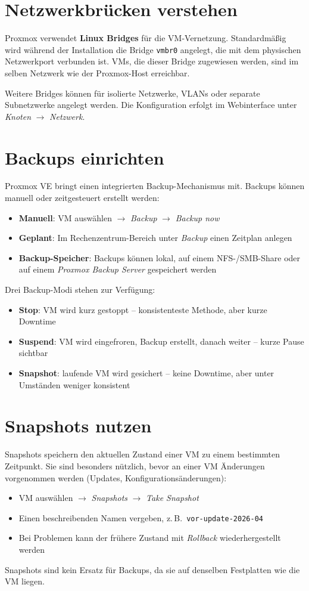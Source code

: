 \documentclass[11pt, oneside, numbers=noenddot]{scrbook}
\begin{document}
\section{Netzwerkbrücken verstehen}
Proxmox verwendet \textbf{Linux Bridges} für die VM-Vernetzung. Standardmäßig wird während der Installation die Bridge \texttt{vmbr0} angelegt, die mit dem physischen Netzwerkport verbunden ist. VMs, die dieser Bridge zugewiesen werden, sind im selben Netzwerk wie der Proxmox-Host erreichbar.

Weitere Bridges können für isolierte Netzwerke, VLANs oder separate Subnetzwerke angelegt werden. Die Konfiguration erfolgt im Webinterface unter \textit{Knoten} $\rightarrow$ \textit{Netzwerk}.

\section{Backups einrichten}
Proxmox VE bringt einen integrierten Backup-Mechanismus mit. Backups können manuell oder zeitgesteuert erstellt werden:
\begin{itemize}
  \item \textbf{Manuell}: VM auswählen $\rightarrow$ \textit{Backup} $\rightarrow$ \textit{Backup now}
  \item \textbf{Geplant}: Im Rechenzentrum-Bereich unter \textit{Backup} einen Zeitplan anlegen
  \item \textbf{Backup-Speicher}: Backups können lokal, auf einem NFS-/SMB-Share oder auf einem \textit{Proxmox Backup Server} gespeichert werden
\end{itemize}

Drei Backup-Modi stehen zur Verfügung:
\begin{itemize}
  \item \textbf{Stop}: VM wird kurz gestoppt -- konsistenteste Methode, aber kurze Downtime
  \item \textbf{Suspend}: VM wird eingefroren, Backup erstellt, danach weiter -- kurze Pause sichtbar
  \item \textbf{Snapshot}: laufende VM wird gesichert -- keine Downtime, aber unter Umständen weniger konsistent
\end{itemize}

\section{Snapshots nutzen}
Snapshots speichern den aktuellen Zustand einer VM zu einem bestimmten Zeitpunkt. Sie sind besonders nützlich, bevor an einer VM Änderungen vorgenommen werden (Updates, Konfigurationsänderungen):
\begin{itemize}
  \item VM auswählen $\rightarrow$ \textit{Snapshots} $\rightarrow$ \textit{Take Snapshot}
  \item Einen beschreibenden Namen vergeben, z.\,B.\ \texttt{vor-update-2026-04}
  \item Bei Problemen kann der frühere Zustand mit \textit{Rollback} wiederhergestellt werden
\end{itemize}

Snapshots sind kein Ersatz für Backups, da sie auf denselben Festplatten wie die VM liegen.
\end{document}
